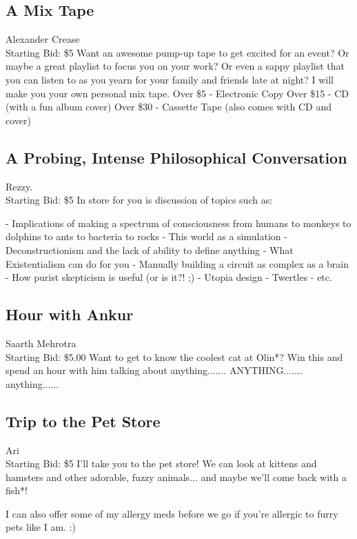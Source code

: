 \documentclass[11pt]{article}
\begin{document}
\subsection{A Mix Tape}
Alexander Crease
\\
Starting Bid: \$5
\newline
Want an awesome pump-up tape to get excited for an event?
Or maybe a great playlist to focus you on your work?
Or even a sappy playlist that you can listen to as you yearn for your family and friends late at night?
I will make you your own personal mix tape.
Over \$5   - Electronic Copy
Over \$15 - CD (with a fun album cover)
Over \$30 - Cassette Tape (also comes with CD and cover)
\subsection{A Probing, Intense Philosophical Conversation}
Rezzy.
\\
Starting Bid: \$5
\newline
In store for you is discussion of topics such as:

- Implications of making a spectrum of consciousness from humans to monkeys to dolphins to ants to bacteria to rocks
- This world as a simulation
- Deconstructionism and the lack of ability to define anything
- What Existentialism can do for you
- Manually building a circuit as complex as a brain
- How purist skepticism is useful (or is it?! ;)
- Utopia design
- Twertles
- etc.
\subsection{Hour with Ankur}
Saarth Mehrotra
\\
Starting Bid: \$5.00
\newline
Want to get to know the coolest cat at Olin*? Win this and spend an hour with him talking about anything....... ANYTHING....... anything......
\subsection{Trip to the Pet Store}
Ari
\\
Starting Bid: \$5
\newline
I'll take you to the pet store! We can look at kittens and hamsters and other adorable, fuzzy animals... and maybe we'll come back with a fish*!

I can also offer some of my allergy meds before we go if you're allergic to furry pets like I am. :)
\end{document}
